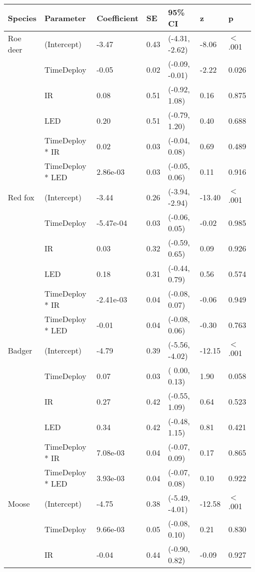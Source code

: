 \begin{table}[ht]
\centering
\begin{tabular}{lllllll}
  \hline
Species & Parameter & Coefficient & SE & 95\% CI & z & p \\ 
  \hline
Roe deer & (Intercept) & -3.47 & 0.43 & (-4.31, -2.62) & -8.06 & $<$ .001 \\ 
   & TimeDeploy & -0.05 & 0.02 & (-0.09, -0.01) & -2.22 & 0.026  \\ 
   & IR & 0.08 & 0.51 & (-0.92,  1.08) & 0.16 & 0.875  \\ 
   & LED & 0.20 & 0.51 & (-0.79,  1.20) & 0.40 & 0.688  \\ 
   & TimeDeploy * IR & 0.02 & 0.03 & (-0.04,  0.08) & 0.69 & 0.489  \\ 
   & TimeDeploy * LED & 2.86e-03 & 0.03 & (-0.05,  0.06) & 0.11 & 0.916  \\ 
  Red fox & (Intercept) & -3.44 & 0.26 & (-3.94, -2.94) & -13.40 & $<$ .001 \\ 
   & TimeDeploy & -5.47e-04 & 0.03 & (-0.06,  0.05) & -0.02 & 0.985  \\ 
   & IR & 0.03 & 0.32 & (-0.59,  0.65) & 0.09 & 0.926  \\ 
   & LED & 0.18 & 0.31 & (-0.44,  0.79) & 0.56 & 0.574  \\ 
   & TimeDeploy * IR & -2.41e-03 & 0.04 & (-0.08,  0.07) & -0.06 & 0.949  \\ 
   & TimeDeploy * LED & -0.01 & 0.04 & (-0.08,  0.06) & -0.30 & 0.763  \\ 
  Badger & (Intercept) & -4.79 & 0.39 & (-5.56, -4.02) & -12.15 & $<$ .001 \\ 
   & TimeDeploy & 0.07 & 0.03 & ( 0.00,  0.13) & 1.90 & 0.058  \\ 
   & IR & 0.27 & 0.42 & (-0.55,  1.09) & 0.64 & 0.523  \\ 
   & LED & 0.34 & 0.42 & (-0.48,  1.15) & 0.81 & 0.421  \\ 
   & TimeDeploy * IR & 7.08e-03 & 0.04 & (-0.07,  0.09) & 0.17 & 0.865  \\ 
   & TimeDeploy * LED & 3.93e-03 & 0.04 & (-0.07,  0.08) & 0.10 & 0.922  \\ 
  Moose & (Intercept) & -4.75 & 0.38 & (-5.49, -4.01) & -12.58 & $<$ .001 \\ 
   & TimeDeploy & 9.66e-03 & 0.05 & (-0.08,  0.10) & 0.21 & 0.830  \\ 
   & IR & -0.04 & 0.44 & (-0.90,  0.82) & -0.09 & 0.927  \\ 

\end{tabular}
\end{table}

